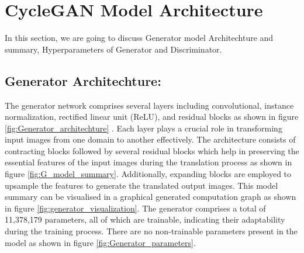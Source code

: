 \documentclass[UKenglish,12pt]{master-style}
\begin{document}
\section{CycleGAN Model Architecture}

In this section, we are going to discuss Generator model Architechture and summary, Hyperparameters of Generator and Discriminator.  

\subsection*{Generator Architechture:} The generator network comprises several layers including convolutional, instance normalization, rectified linear unit (ReLU), and residual blocks as shown in figure \ref{fig:Generator_architechture} . Each layer plays a crucial role in transforming input images from one domain to another effectively. The architecture consists of contracting blocks followed by several residual blocks which help in preserving the essential features of the input images during the translation process as shown in figure \ref{fig:G_model_summary}. Additionally, expanding blocks are employed to upsample the features to generate the translated output images.
This model summary can be visualised in a graphical generated computation graph as shown in figure \ref{fig:generator_visualization}.
The generator comprises a total of 11,378,179 parameters, all of which are trainable, indicating their adaptability during the training process. There are no non-trainable parameters present in the model as shown in figure \ref{fig:Generator_parameters}. 
\end{document}
